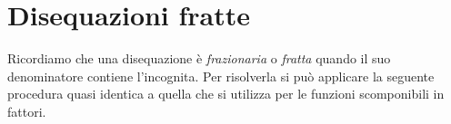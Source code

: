 \begin{comment}
\begin{esempio}
Risolvi la disequazione: \(1-81x^4<0\)

Il binomio a primo membro può essere scomposto in fattori irriducibili in due 
passi:
\[1-81x^4 = \left(1-9x^2\right)\left(1+9x^2\right)=
  \left(-9x^2+1\right)\left(9x^2+1\right)\]
Anche qui possiamo usare un po' di furbizia e calcolare la soluzione molto 
rapidamente.
\end{esempio}

\begin{esempio}
Risolvere la disequazione: \(x^4-4x^2-45 \ge 0\)

Il trinomio al primo membro è di quarto grado ma sappiamo che con la 
sostituzione: 
\(x^2=z\)

può essere ricondotto al trinomio di secondo grado:
\(z^2-4z-45 \ge 0\)

la cui scomposizione in fattori risulta:
\(\left(z-9\right)\left(z+5\right)\)

quindi la disequazione assegnata diventa: 
\((x^2-9)(x^2+5) \ge 0\)

Completa la soluzione della disequazione.
\end{esempio}

% 

\end{comment}

\newpage %

\section{Disequazioni fratte}
\label{sec:diseq_fratte}

Ricordiamo che una disequazione è \emph{frazionaria} o \emph{fratta} quando 
il suo denominatore contiene l'incognita. 
Per risolverla si può applicare la seguente procedura quasi identica a quella 
che si utilizza per le funzioni scomponibili in fattori.

